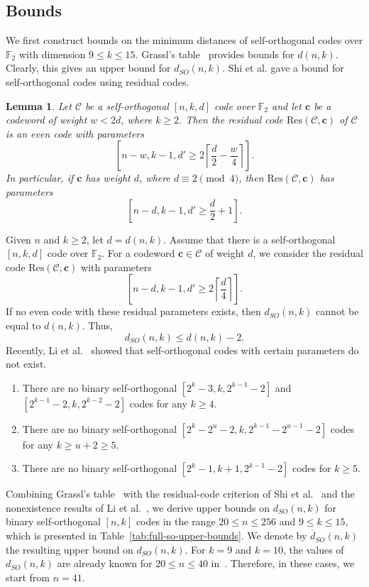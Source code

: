 \documentclass{article}
\newtheorem{lemma}{Lemma}
\begin{document}
\subsection{Bounds}\label{experiments-bound}
We first construct bounds on the minimum distances of self-orthogonal codes over $\mathbb{F}_2$ with dimension $9 \leq k \leq 15$. Grassl's table~\cite{grassl} provides bounds for $d(n,k)$. Clearly, this gives an upper bound for $d_{SO}(n,k)$. Shi et al. gave a bound for self-orthogonal codes using residual codes.
\begin{lemma}\cite{bound}
    Let $\mathcal{C}$ be a self-orthogonal $[n,k,d]$ code over $\mathbb{F}_2$ and let $\mathbf{c}$ be a codeword of weight $w < 2d$, where $k \geq 2$. Then the residual code $\mathrm{Res}(\mathcal{C},\mathbf{c})$ of $\mathcal{C}$ is an even code with parameters
    \[
    \left[n-w, k-1, d' \geq 2 \left\lceil\frac{d}{2}-\frac{w}{4}\right\rceil\right].
    \] In particular, if $\mathbf{c}$ has weight $d$, where $d \equiv 2 \pmod4$, then $\mathrm{Res}(\mathcal{C},\mathbf{c})$ has parameters \[
    \left[ n-d, k-1, d' \geq \frac{d}{2}+1 \right].
    \]
\end{lemma}
Given $n$ and $k \geq 2$, let $d=d(n,k)$. Assume that there is a self-orthogonal $[n,k,d]$ code over $\mathbb{F}_2$. For a codeword $\mathbf{c} \in \mathcal{C}$ of weight $d$, we consider the residual code $\mathrm{Res}(\mathcal{C},\mathbf{c})$ with parameters \[
\left[n-d, k-1, d' \geq 2 \left\lceil\frac{d}{4}\right\rceil\right].
\]
If no even code with these residual parameters exists, then $d_{SO}(n,k)$ cannot be equal to $d(n,k)$. Thus, \[
d_{SO}(n,k) \leq d(n,k)-2.
\]
Recently, Li et al.~\cite{bound2} showed that self-orthogonal codes with certain parameters do not exist.
\begin{enumerate}
    \item There are no binary self-orthogonal $[2^k-3, k, 2^{k-1}-2]$ and $[2^{k-1}-2, k, 2^{k-2}-2]$ codes for any $k \geq 4$.
    \item There are no binary self-orthogonal $[2^k-2^u-2, k, 2^{k-1}-2^{u-1}-2]$ codes for any $k \geq u+2 \geq 5$.
    \item There are no binary self-orthogonal $[2^k-1, k+1, 2^{k-1}-2]$ codes for $k \geq 5$.
\end{enumerate}
Combining Grassl's table~\cite{grassl} with the residual-code criterion of Shi et al.~\cite{bound} and the nonexistence results of Li et al.~\cite{bound2}, we derive upper bounds on $d_{SO}(n,k)$ for binary self-orthogonal $[n,k]$ codes in the range $20\leq n\leq 256$ and $9\leq k\leq 15$, which is presented in Table~\ref{tab:full-so-upper-bounds}. We denote by $\overline{d}_{SO}(n,k)$ the resulting upper bound on $d_{SO}(n,k)$.
For $k=9$ and $k=10$, the values of $d_{SO}(n,k)$ are already known for $20\leq n\leq 40$ in~\cite{optimal-so-bound}. Therefore, in these cases, we start from $n=41$.
\end{document}
